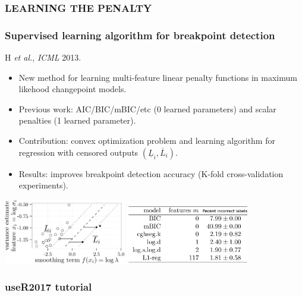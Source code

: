 \documentclass{beamer}
\begin{document}
\begin{frame}
  \frametitle{LEARNING THE PENALTY}
  
\end{frame}


\begin{frame}
  \frametitle{Supervised learning algorithm for breakpoint detection}
  H {\it et al.}, {\it ICML} 2013.
  \begin{itemize}
  \item New method for learning multi-feature linear penalty
    functions in maximum likehood changepoint models.
  \item Previous work: AIC/BIC/mBIC/etc (0 learned parameters)
    and scalar penalties (1 learned parameter).
  \item Contribution: convex optimization problem and learning
    algorithm for regression with censored outputs
    $(\underline L_i, \overline L_i)$.
  \item Results: improves breakpoint detection accuracy (K-fold
    cross-validation experiments).
  \end{itemize}
\includegraphics[width=0.4\textwidth]{screenshot-mmir-crop}
\includegraphics[width=0.4\textwidth]{screenshot-mmir-test-error}
\end{frame}

\begin{frame}
  \frametitle{useR2017 tutorial}
  
\end{frame}
\end{document}
